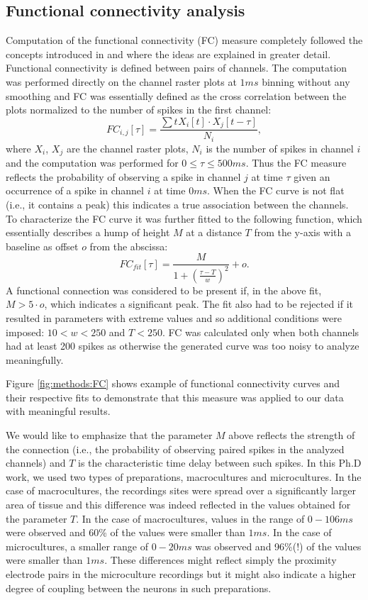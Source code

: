 \subsection{Functional connectivity analysis}
Computation of the functional connectivity (FC) measure completely followed the concepts introduced in \cite{le2007conditional} and where the ideas are explained in greater detail. Functional connectivity is defined between pairs of channels. The computation was performed directly on the channel raster plots at \(1ms\) binning without any smoothing and FC was essentially defined as the cross correlation between the plots normalized to the number of spikes in the first channel: \[FC_{i,j}[\tau]=\frac{\sum{t}^{}X_i[t]\cdot X_j[t-\tau]}{N_i},\] where \(X_i\), \(X_j\) are the channel raster plots, \(N_i\) is the number of spikes in channel \(i\) and the computation was performed for \(0\le \tau \le 500ms\). Thus the FC measure reflects the probability of observing a spike in channel \(j\) at time \(\tau\) given an occurrence of a spike in channel \(i\) at time \(0ms\). When the FC curve is not flat (i.e., it contains a peak) this indicates a true association between the channels. To characterize the FC curve it was further fitted to the following function, which essentially describes a hump of height \(M\) at a distance \(T\) from the y-axis with a baseline as offset \(o\) from the abscissa: \[FC_{fit}[\tau]=\frac{M}{1+\left(\frac{\tau-T}{w}\right)^{2}}+o.\]
A functional connection was considered to be present if, in the above fit, \(M>5\cdot o\), which indicates a significant peak. The fit also had to be rejected if it resulted in parameters with extreme values and so additional conditions were imposed: \(10<w<250\) and \(T<250\). FC was calculated only when both channels had at least 200 spikes as otherwise the generated curve was too noisy to analyze meaningfully.

Figure \ref{fig:methods:FC} shows example of functional connectivity curves and their respective fits to demonstrate that this measure was applied to our data with meaningful results.

We would like to emphasize that the parameter \(M\) above reflects the strength of the connection (i.e., the probability of observing paired spikes in the analyzed channels) and \(T\) is the characteristic time delay between such spikes. In this Ph.D work, we used two types of preparations, macrocultures and microcultures. In the case of macrocultures, the recordings sites were spread over a significantly larger area of tissue and this difference was indeed reflected in the values obtained for the parameter \(T\). In the case of macrocultures, values in the range of \(0-106ms\) were observed and 60\% of the values were smaller than \(1ms\). In the case of microcultures, a smaller range of \(0-20ms\) was observed and 96\%(!) of the values were smaller than \(1 ms\). These differences might reflect simply the proximity electrode pairs in the microculture recordings but it might also indicate a higher degree of coupling between the neurons in such preparations.

